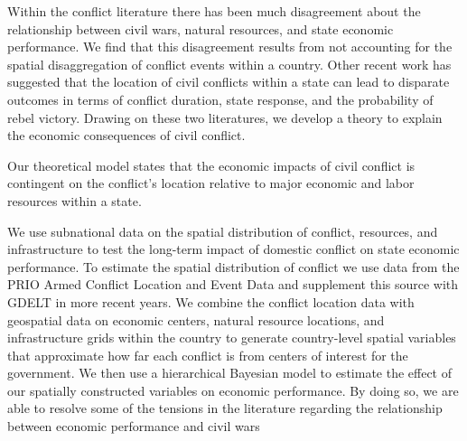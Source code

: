 Within the conflict literature there has been much disagreement about the relationship between civil wars, natural resources, and state economic performance. We find that this disagreement results from not accounting for the spatial disaggregation of conflict events within a country.  Other recent work has suggested that the location of civil conflicts within a state can lead to disparate outcomes in terms of conflict duration, state response, and the probability of rebel victory.  Drawing on these two literatures, we develop a theory to explain the economic consequences of civil conflict.

Our theoretical model states that the economic impacts of civil conflict is contingent on the conflict's location relative to major economic and labor resources within a state.

We use subnational data on the spatial distribution of conflict, resources, and infrastructure to test the long-term impact of domestic conflict on state economic performance. To estimate the spatial distribution of conflict we use data from the PRIO Armed Conflict Location and Event Data and supplement this source with GDELT in more recent years. We combine the conflict location data with geospatial data on economic centers, natural resource locations, and infrastructure grids within the country to generate country-level spatial variables that approximate how far each conflict is from centers of interest for the government. We then use a hierarchical Bayesian model to estimate the effect of our spatially constructed variables on economic performance. By doing so, we are able to resolve some of the tensions in the literature regarding the relationship between economic performance and civil wars



